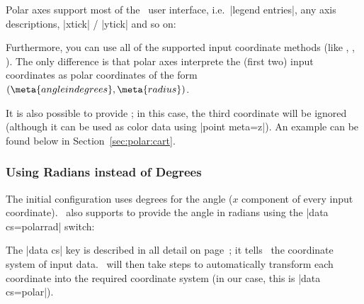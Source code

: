 {Polar axes support most of the \PGFPlots\ user interface, i.e.\ |legend entries|, any axis descriptions, |xtick| / |ytick| and so on:
\begin{codeexample}[]
\end{codeexample}
\noindent Furthermore, you can use all of the supported input coordinate methods (like , , ). The only difference is that polar axes interprete the (first two) input coordinates as polar coordinates of the form $(\meta{angle in degrees},\meta{radius})$.

It is also possible to provide ; in this case, the third coordinate will be ignored (although it can be used as color data using |point meta=z|). An example can be found below in Section~\ref{sec:polar:cart}.


\subsubsection{Using Radians instead of Degrees}
The initial configuration uses degrees for the angle ($x$ component of every input coordinate). \PGFPlots\ also supports to provide the angle in radians using the |data cs=polarrad| switch:
\begin{codeexample}[]
\end{codeexample}
The |data cs| key is described in all detail on page~\pageref{key:data:cs}; it tells \PGFPlots\ the coordinate system of input data. \PGFPlots\ will then take steps to automatically transform each coordinate into the required coordinate system (in our case, this is |data cs=polar|).

}
